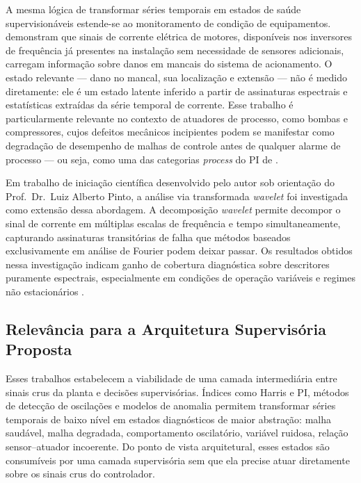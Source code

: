 A mesma lógica de transformar séries temporais em estados de saúde supervisionáveis estende-se ao monitoramento de condição de equipamentos.  demonstram que sinais de corrente elétrica de motores, disponíveis nos inversores de frequência já presentes na instalação sem necessidade de sensores adicionais, carregam informação sobre danos em mancais do sistema de acionamento. O estado relevante --- dano no mancal, sua localização e extensão --- não é medido diretamente: ele é um estado latente inferido a partir de assinaturas espectrais e estatísticas extraídas da série temporal de corrente. Esse trabalho é particularmente relevante no contexto de atuadores de processo, como bombas e compressores, cujos defeitos mecânicos incipientes podem se manifestar como degradação de desempenho de malhas de controle antes de qualquer alarme de processo --- ou seja, como uma das categorias \textit{process} do PI de .

Em trabalho de iniciação científica desenvolvido pelo autor sob orientação do Prof.\ Dr.\ Luiz Alberto Pinto, a análise via transformada \textit{wavelet} foi investigada como extensão dessa abordagem. A decomposição \textit{wavelet} permite decompor o sinal de corrente em múltiplas escalas de frequência e tempo simultaneamente, capturando assinaturas transitórias de falha que métodos baseados exclusivamente em análise de Fourier podem deixar passar. Os resultados obtidos nessa investigação indicam ganho de cobertura diagnóstica sobre descritores puramente espectrais, especialmente em condições de operação variáveis e regimes não estacionários \cite{Lessmeier2016}.

\subsection{Relevância para a Arquitetura Supervisória Proposta}

Esses trabalhos estabelecem a viabilidade de uma camada intermediária entre sinais crus da planta e decisões supervisórias. Índices como Harris e PI, métodos de detecção de oscilações e modelos de anomalia permitem transformar séries temporais de baixo nível em estados diagnósticos de maior abstração: malha saudável, malha degradada, comportamento oscilatório, variável ruidosa, relação sensor--atuador incoerente. Do ponto de vista arquitetural, esses estados são consumíveis por uma camada supervisória sem que ela precise atuar diretamente sobre os sinais crus do controlador.

